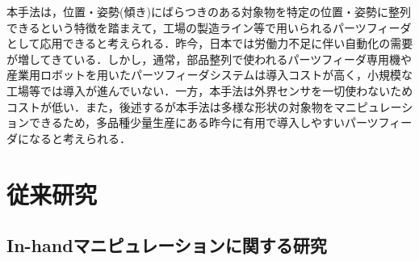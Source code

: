 \documentclass[a4paper,twoside,12pt,papersize, dvipdfmx]{iirthesis}
\begin{document}
本手法は，位置・姿勢(傾き)にばらつきのある対象物を特定の位置・姿勢に整列できるという特徴を踏まえて，工場の製造ライン等で用いられるパーツフィーダとして応用できると考えられる．昨今，日本では労働力不足に伴い自動化の需要が増してきている．しかし，通常，部品整列で使われるパーツフィーダ専用機や産業用ロボットを用いたパーツフィーダシステムは導入コストが高く，小規模な工場等では導入が進んでいない．一方，本手法は外界センサを一切使わないためコストが低い．また，後述するが本手法は多様な形状の対象物をマニピュレーションできるため，多品種少量生産にある昨今に有用で導入しやすいパーツフィーダになると考えられる．


\section{従来研究}\label{sec::intro::relatedresearch}
\subsection{In-handマニピュレーションに関する研究}
\end{document}
